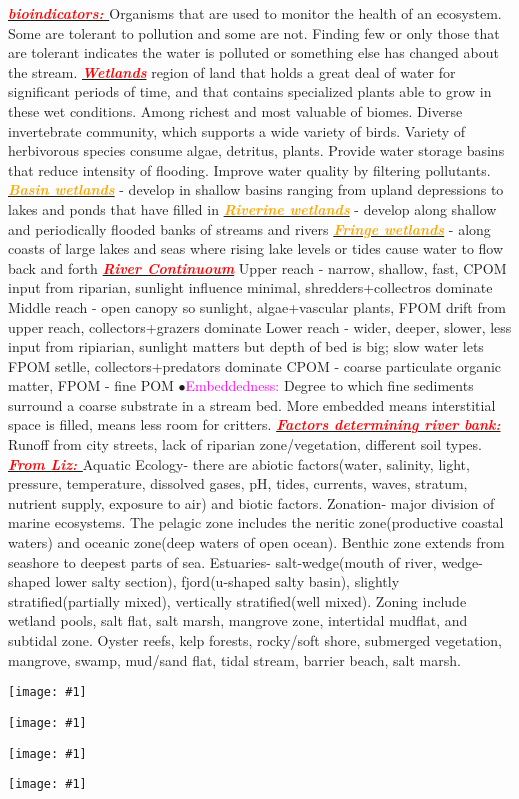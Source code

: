 \documentclass{article}
\newcommand{\ddd}{$\bullet$}
\newcommand{\red}[1]{\textcolor{red}{#1}}
\newcommand{\pink}[1]{\textcolor{magenta}{#1}}
\newcommand{\orange}[1]{\textcolor{orange}{#1}}
\newcommand{\mysection}[1]{\underline{{\textbf{\textit{\red{#1}}}}}}
\newcommand{\mysubsection}[1]{\underline{\textbf{{\textit{\orange{#1}}}}}}
\newcommand{\vocab}[1]{{\pink{#1}}}
\newcommand{\fig}[1]{
	\texttt{[image: \#1]}
}
\begin{document}
\begin{multicols*}{4}
	\mysection{bioindicators: }
		Organisms that are used to monitor the health of an ecosystem. Some are tolerant to pollution and some are not. Finding few or only those that are tolerant indicates the water is polluted or something else has changed about the stream.
	\mysection{Wetlands}
		 region of land that holds a great deal of water for significant periods of time, and that contains specialized plants able to grow in these wet conditions. Among richest and most valuable of biomes. Diverse invertebrate community, which supports a wide variety of birds. Variety of herbivorous species consume algae, detritus, plants. Provide water storage basins that reduce intensity of flooding. Improve water quality by filtering pollutants. 
		 \mysubsection{Basin wetlands} - develop in shallow basins ranging from upland depressions to lakes and ponds that have filled in \mysubsection{Riverine wetlands} - develop along shallow and periodically flooded banks of streams and rivers \mysubsection{Fringe wetlands} - along coasts of large lakes and seas where rising lake levels or tides cause water to flow back and forth
 	\mysection{River Continuoum} 
 		Upper reach - narrow, shallow, fast, CPOM input from riparian, sunlight influence minimal, shredders+collectros dominate Middle reach - open canopy so sunlight, algae+vascular plants, FPOM drift from upper reach, collectors+grazers dominate Lower reach - wider, deeper, slower, less input from ripiarian, sunlight matters but depth of bed is big; slow water lets FPOM setlle, collectors+predators dominate CPOM - coarse particulate organic matter, FPOM - fine POM
 	\ddd \vocab{Embeddedness: } Degree to which fine sediments surround a coarse substrate in a stream bed. More embedded means interstitial space is filled, means less room for critters. 
 	\mysection{Factors determining river bank: } Runoff from city streets, lack of riparian zone/vegetation, different soil types.
 	\mysection{From Liz: }Aquatic Ecology- there are abiotic factors(water, salinity, light, pressure, temperature, dissolved gases, pH, tides, currents, waves, stratum,
 	nutrient supply, exposure to air) and biotic factors. Zonation- major division of marine ecosystems. The pelagic zone includes the neritic
 	zone(productive coastal waters) and oceanic zone(deep waters of open ocean). Benthic zone extends from seashore to deepest parts of sea.
 	Estuaries- salt-wedge(mouth of river, wedge-shaped lower salty section), fjord(u-shaped salty basin), slightly stratified(partially mixed),
 	vertically stratified(well mixed). Zoning include wetland pools, salt flat, salt marsh, mangrove zone, intertidal mudflat, and subtidal zone. Oyster
 	reefs, kelp forests, rocky/soft shore, submerged vegetation, mangrove, swamp, mud/sand flat, tidal stream, barrier beach, salt marsh.
 	\fig{disc}
 	\fig{treatment}
 	\fig{potable}
 	\fig{eco}
\end{multicols*}
\end{document}
